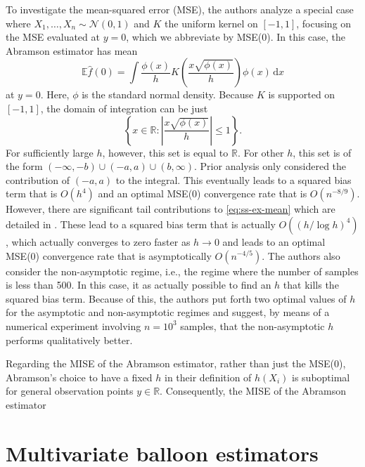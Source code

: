\documentclass{article}
\newcommand{\E}{\mathbb{E}}
\newcommand{\R}{\mathbb{R}}
\newcommand{\abs}[1]{\left|#1\right|}
\newcommand{\dd}[1]{\,\text{d}#1}
\begin{document}
To investigate the mean-squared error (MSE), the authors analyze a special case where $X_1, \dots, X_n \sim \mathcal{N}(0,1)$ and $K$ the uniform kernel on $[-1,1]$, focusing on the MSE evaluated at $y=0$, which we abbreviate by MSE(0). In this case, the Abramson estimator has mean 
\begin{equation}\label{eq:ss-ex-mean}
    \E \hat{f}(0) = \int \frac{\phi(x)}{h} K\left(\frac{x\sqrt{\phi(x)}}{h}\right) \phi(x)\dd{x}
\end{equation}
at $y=0$. Here, $\phi$ is the standard normal density. Because $K$ is supported on $[-1,1]$, the domain of integration can be just 
\begin{equation}\label{eq:ss-ex-dom}
    \left\{x \in \R : \abs{\frac{x\sqrt{\phi(x)}}{h}} \leq 1\right\}.
\end{equation}
For sufficiently large $h$, however, this set is equal to $\R$. For other $h$, this set is of the form $(-\infty,-b) \cup (-a,a) \cup(b,\infty)$. Prior analysis only considered the contribution of $(-a,a)$ to the integral. This eventually leads to a squared bias term that is $O\left(h^4\right)$ and an optimal MSE(0) convergence rate that is $O\left(n^{-8/9}\right)$. However, there are significant tail contributions to \eqref{eq:ss-ex-mean} which are detailed in \cite{vkde}. These lead to a squared bias term that is actually $O\left(\left(h / \log h\right)^4\right)$, which actually converges to zero faster as $h \to 0$ and leads to an optimal MSE(0) convergence rate that is asymptotically $O\left(n^{-4/5}\right)$. The authors also consider the non-asymptotic regime, i.e., the regime where the number of samples is less than 500. In this case, it as actually possible to find an $h$ that kills the squared bias term. Because of this, the authors put forth two optimal values of $h$ for the asymptotic and non-asymptotic regimes and suggest, by means of a numerical experiment involving $n=10^3$ samples, that the non-asymptotic $h$ performs qualitatively better.

Regarding the MISE of the Abramson estimator, rather than just the MSE(0), Abramson's choice to have a fixed $h$ in their definition of $h(X_i)$ is suboptimal for general observation points $y \in \R$. Consequently, the MISE of the Abramson estimator

\section{Multivariate balloon estimators}
\end{document}
